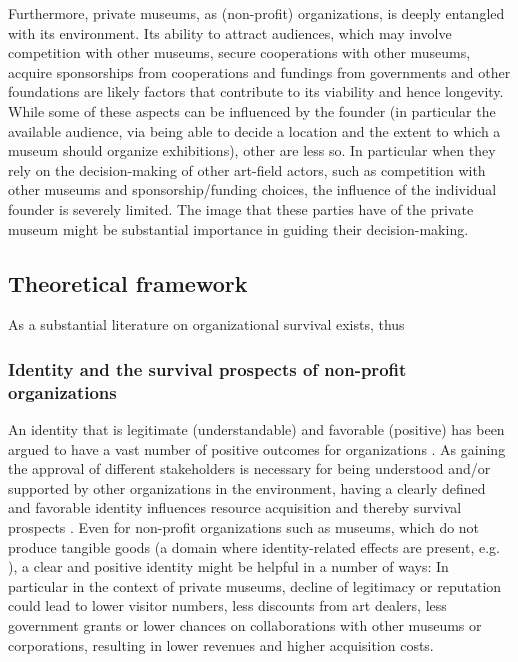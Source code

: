 \documentclass[12pt]{article}
\begin{document}
Furthermore, private museums, as (non-profit) organizations, is deeply entangled with its environment.
Its ability to attract audiences, which may involve competition with other museums, secure cooperations with other museums, acquire sponsorships from cooperations and fundings from governments and other foundations are likely factors that contribute to its viability and hence longevity.
While some of these aspects can be influenced by the founder (in particular the available audience, via being able to decide a location and the extent to which a museum should organize exhibitions), other are less so.
In particular when they rely on the decision-making of other art-field actors, such as competition with other museums and sponsorship/funding choices, the influence of the individual founder is severely limited.
The image that these parties have of the private museum might be substantial importance in guiding their decision-making.




\subsection*{Theoretical framework}


As a substantial literature on organizational survival exists, thus


\subsubsection*{Identity and the survival prospects of non-profit organizations}

An identity that is legitimate (understandable) and favorable (positive) has been argued to have a vast number of positive outcomes for organizations \parencite{Lange_Lee_Dai_2010_reputation}.
As gaining the approval of different stakeholders is necessary for being understood and/or supported by other organizations in the environment, having a clearly defined and favorable identity influences resource acquisition and thereby survival prospects \parencite{Rao_1994_reputation}.
Even for non-profit organizations such as museums, which do not produce tangible goods (a domain where identity-related effects are present, e.g. \cite{Hsu_2015_granted,Bogaert_etal_2014_ecological}), a clear and positive identity might be helpful in a number of ways:
In particular in the context of private museums, decline of legitimacy or reputation could lead to lower visitor numbers, less discounts from art dealers, less government grants or lower chances on collaborations with other museums or corporations, resulting in lower revenues and higher acquisition costs.
\end{document}
